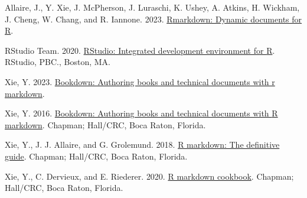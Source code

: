 \documentclass[fleqn,10pt,lineno]{wlpeerj} %
\newlength{\cslhangindent}
\newenvironment{CSLReferences}[2] %
 {\begin{list}{}{%
  \setlength{\itemindent}{0pt}
  \setlength{\leftmargin}{0pt}
  \setlength{\parsep}{0pt}
  \ifodd #1
   \setlength{\leftmargin}{\cslhangindent}
   \setlength{\itemindent}{-1\cslhangindent}
  \fi
  \setlength{\itemsep}{#2\baselineskip}}}
 {\end{list}}
\begin{document}
\label{refs}
\begin{CSLReferences}{1}{0}
Allaire, J., Y. Xie, J. McPherson, J. Luraschi, K. Ushey, A. Atkins, H. Wickham, J. Cheng, W. Chang, and R. Iannone. 2023. \href{https://github.com/rstudio/rmarkdown}{{R}markdown: Dynamic documents for {R}}.

RStudio Team. 2020. \href{http://www.rstudio.com/}{R{S}tudio: Integrated development environment for {R}}. RStudio, PBC., Boston, MA.

Xie, Y. 2023. \href{https://github.com/rstudio/bookdown}{Bookdown: Authoring books and technical documents with r markdown}.

Xie, Y. 2016. \href{https://bookdown.org/yihui/bookdown}{Bookdown: Authoring books and technical documents with {R} markdown}. Chapman; Hall/CRC, Boca Raton, Florida.

Xie, Y., J. J. Allaire, and G. Grolemund. 2018. \href{https://bookdown.org/yihui/rmarkdown}{R markdown: The definitive guide}. Chapman; Hall/CRC, Boca Raton, Florida.

Xie, Y., C. Dervieux, and E. Riederer. 2020. \href{https://bookdown.org/yihui/rmarkdown-cookbook}{R markdown cookbook}. Chapman; Hall/CRC, Boca Raton, Florida.

\end{CSLReferences}
\end{document}
